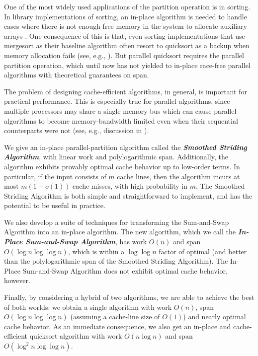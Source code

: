 \documentclass[a4paper,UKenglish,cleveref, autoref, thm-restate]{lipics-v2019}
\newcommand{\defn}[1]{{\textit{\textbf{\boldmath #1}}}}
\renewcommand{\paragraph}[1]{\vspace{0.09in}\noindent{\bf \boldmath #1.}}
\begin{document}
One of the most widely used applications of the partition operation is
in sorting. In library implementations of sorting, an in-place
algorithm is needed to handle cases where there is not enough free
memory in the system to allocate auxiliary arrays \cite{gnu,
  openbsd}. One consequence of this is that, even sorting
implementations that use mergesort as their baseline algorithm often
resort to quicksort as a backup when memory allocation fails (see,
e.g., \cite{gnu}). But parallel quicksort requires the parallel
partition operation, which until now has not yielded to in-place
race-free parallel algorithms with theoretical guarantees on span.

The problem of designing cache-efficient algorithms, in general, is
important for practical performance. This is especially true for
parallel algorithms, since multiple processors may share a single
memory bus which can cause parallel algorithms to become
memory-bandwidth limited even when their sequential counterparts were
not (see, e.g., discussion in \cite{DeakinPrMa18, NiDME09}).

\paragraph{Our Results}
We give an in-place parallel-partition algorithm called the
\defn{Smoothed Striding Algorithm}, with linear work and
polylogarithmic span. Additionally, the algorithm exhibits provably
optimal cache behavior up to low-order terms. In particular, if the
input consists of $m$ cache lines, then the algorithm incurs at most
$m(1 + o(1))$ cache misses, with high probability in $m$. The Smoothed
Striding Algorithm is both simple and straightforward to implement,
and has the potential to be useful in practice.

We also develop a suite of techniques for transforming the
Sum-and-Swap Algorithm into an in-place algorithm. The new algorithm,
which we call the \defn{In-Place Sum-and-Swap Algorithm}, has work
$O(n)$ and span $O(\log n \log \log n)$, which is within a
$\log \log n$ factor of optimal (and better than the polylogarithmic
span of the Smoothed Striding Algorithm). The In-Place Sum-and-Swap
Algorithm does not exhibit optimal cache behavior, however.

Finally, by considering a hybrid of two algorithms, we are able to
achieve the best of both worlds: we obtain a single algorithm with
work $O(n)$, span $O(\log n \log \log n)$ (assuming a cache-line size
of $O(1)$) and nearly optimal cache behavior. As an immediate
consequence, we also get an in-place and cache-efficient quicksort
algorithm with work $O(n \log n)$ and span $O(\log^2 n \log \log n)$.
\end{document}
